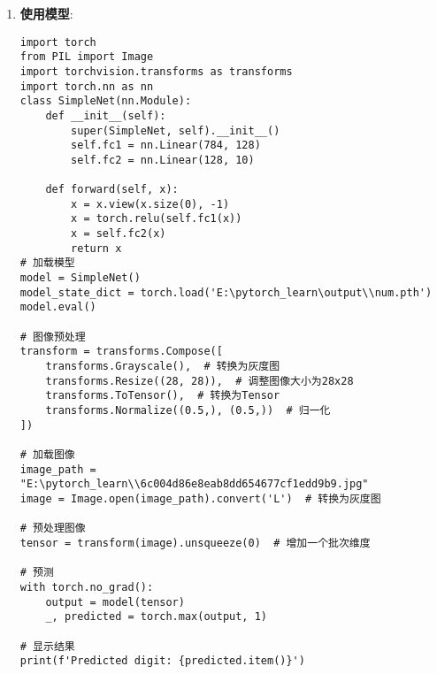 \documentclass{ctexart}
\begin{document}
\begin{enumerate}[label=\arabic*.]
\begin{lstlisting}
# 损失函数和优化器
criterion = nn.CrossEntropyLoss()
optimizer = optim.SGD(model.parameters(), lr=0.01)

# 训练模型
for epoch in range(20):  # 迭代20个epoch
    for i, data in enumerate(trainloader, 0):
        inputs, labels = data
        optimizer.zero_grad()
        outputs = model(inputs)
        loss = criterion(outputs, labels)
        loss.backward()
        optimizer.step()

        if (i + 1) % 100 == 0:
            print(f'Epoch [{epoch + 1}/20], Step [{i + 1}/600], Loss: {loss.item():.4f}')

torch.save(model.state_dict(), 'output')
\end{lstlisting}
训练了一个手写数字识别的模型,下载了一个data，里面有raw，用于训练，自己创建一个.pth文件，用于保存模型，训练了一个可以预测手写数字的模型，这里训练20圈\\
\texttt{[image: 屏幕截图 2024-09-16 030543.png]}
\item \textbf{使用模型}:
\begin{lstlisting}
import torch
from PIL import Image
import torchvision.transforms as transforms
import torch.nn as nn
class SimpleNet(nn.Module):
    def __init__(self):
        super(SimpleNet, self).__init__()
        self.fc1 = nn.Linear(784, 128)
        self.fc2 = nn.Linear(128, 10)

    def forward(self, x):
        x = x.view(x.size(0), -1)
        x = torch.relu(self.fc1(x))
        x = self.fc2(x)
        return x
# 加载模型
model = SimpleNet()
model_state_dict = torch.load('E:\pytorch_learn\output\\num.pth')
model.eval()

# 图像预处理
transform = transforms.Compose([
    transforms.Grayscale(),  # 转换为灰度图
    transforms.Resize((28, 28)),  # 调整图像大小为28x28
    transforms.ToTensor(),  # 转换为Tensor
    transforms.Normalize((0.5,), (0.5,))  # 归一化
])

# 加载图像
image_path = "E:\pytorch_learn\\6c004d86e8eab8dd654677cf1edd9b9.jpg"
image = Image.open(image_path).convert('L')  # 转换为灰度图

# 预处理图像
tensor = transform(image).unsqueeze(0)  # 增加一个批次维度

# 预测
with torch.no_grad():
    output = model(tensor)
    _, predicted = torch.max(output, 1)

# 显示结果
print(f'Predicted digit: {predicted.item()}')


\end{lstlisting}
\end{enumerate}
\end{document}
